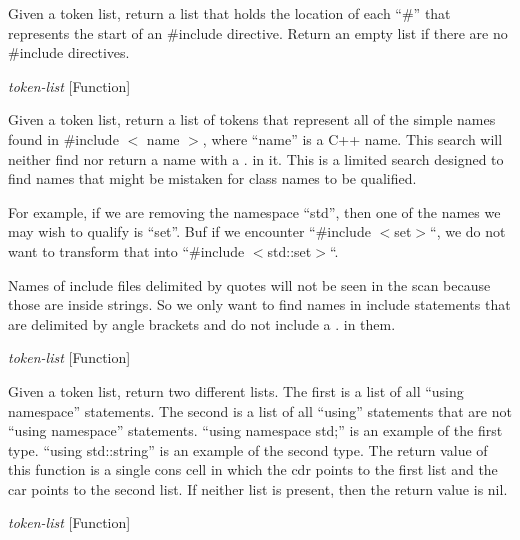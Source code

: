 \begin{doc-string}
Given a token list, return a list that holds the location of each ``\#'' that
represents the start of an \#include directive.  Return an empty list if there
are no \#include directives.
\end{doc-string}

\vspace{1em}
\noindent
{}
\usebox{\funcname}\emph{token-list}
 \hfill [Function]

\begin{doc-string}
Given a token list, return a list of tokens that represent all of the simple
names found in \#include $<$ name $>$, where ``name'' is a C++ name.  This search
will neither find nor return a name with a . in it.  This is a limited search
designed to find names that might be mistaken for class names to be qualified.

For example, if we are removing the namespace ``std'', then one of the names we
may wish to qualify is ``set''.  Buf if we encounter ``\#include $<$set$>$``, we do
not want to transform that into ``\#include $<$std::set$>$``.

Names of include files delimited by quotes will not be seen in the scan because
those are inside strings.  So we only want to find names in include statements
that are delimited by angle brackets and do not include a . in them.
\end{doc-string}

\vspace{1em}
\noindent
{}
\usebox{\funcname}\emph{token-list}
 \hfill [Function]

\begin{doc-string}
Given a token list, return two different lists.  The first is a list of all
``using namespace'' statements.  The second is a list of all ``using''
statements that are not ``using namespace'' statements.  ``using namespace
std;'' is an example of the first type.  ``using std::string'' is an example of
the second type.
The return value of this function is a single cons cell in which the cdr points
to the first list and the car points to the second list.
If neither list is present, then the return value is nil.
\end{doc-string}

\vspace{1em}
\noindent
{}
\usebox{\funcname}\emph{token-list}
 \hfill [Function]

